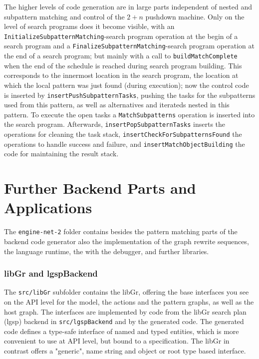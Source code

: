 The higher levels of code generation are in large parts independent of nested and subpattern matching and control of the $2+n$ pushdown machine.
Only on the level of search programs does it become visible,  
with an \texttt{Initialize\-Subpattern\-Matching}-search program operation at the begin of a search program
and a \texttt{Finalize\-Subpattern\-Matching}-search program operation at the end of a search program;
but mainly with a call to \texttt{build\-Match\-Complete} when the end of the schedule is reached during search program building.
This corresponds to the innermost location in the search program,
the location at which the local pattern was just found (during execution);
now the control code is inserted by \texttt{insert\-Push\-Subpattern\-Tasks},
pushing the tasks for the subpatterns used from this pattern, as well as alternatives and iterateds nested in this pattern.
To execute the open tasks a \texttt{Match\-Subpatterns} operation is inserted into the search program. 
Afterwards, \texttt{insert\-Pop\-Subpattern\-Tasks} inserts the operations for cleaning the task stack,
\texttt{insert\-Check\-For\-Subpatterns\-Found} the operations to handle success and failure, 
and \texttt{insert\-Match\-Object\-Building} the code for maintaining the result stack.


\section{Further Backend Parts and Applications}

The \texttt{engine-net-2} folder contains besides the pattern matching parts of the backend code generator also the implementation of the graph rewrite sequences, the language runtime, the \GrShell{} with the debugger, and further libraries.


\subsubsection*{libGr and lgspBackend}

The \texttt{src/libGr} subfolder contains the libGr, offering the base interfaces you see on the API level for the model, the actions and the pattern graphs, as well as the host graph.
The interfaces are implemented by code from the libGr search plan (lgsp) backend in \texttt{src/lgspBackend} and by the generated code.
The generated code defines a type-safe interface of named and typed entities, which is more convenient to use at API level, but bound to a specification.
The libGr in contrast offers a "generic", name string and object or root type based interface.


